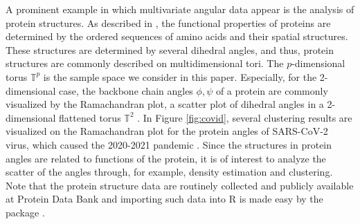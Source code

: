 

 A prominent example in which multivariate angular data appear is the analysis of protein structures. As described in \citet{protein}, the functional properties of proteins are determined by the ordered sequences of amino acids and their spatial structures. These structures are determined by several dihedral angles, and thus, protein structures are commonly described on multidimensional tori. The $p$-dimensional torus $\mathbb{T}^p$ is the sample space we consider in this paper. Especially, for the 2-dimensional case, the backbone chain angles $\phi,\psi$ of a protein are commonly visualized by the Ramachandran plot, a scatter plot of   dihedral angles in  a 2-dimensional flattened torus $\mathbb{T}^2$ \citep{lovell2003structure,oberholser2010proteopedia}. In Figure \ref{fig:covid},  several clustering results are visualized on the Ramachandran plot for the protein angles of SARS-CoV-2 virus, which caused the 2020-2021 pandemic \citep{Coronaviridae:2020}. Since the structures in protein angles are related to functions of the protein, it is of interest to analyze the scatter of the angles through, for example, density estimation and clustering. Note that the protein structure data are routinely collected and publicly available at Protein Data Bank \citep{pdb} and importing such data into R is made easy by the package  \citep{Grant:2006,bio3d}.

